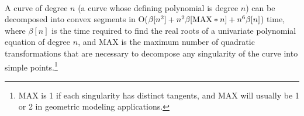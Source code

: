 \ \ \ 

\vspace{.1in}

\begin{theorem}
\label{thm-5}
A curve of degree $n$ {\rm (}a curve whose defining polynomial is degree $n${\rm )} 
can be decomposed into convex segments in
O{\rm (}$\beta[n^{2}] + n^{2}\beta[{\rm MAX} * n] + n^{6}\beta[n]${\rm )} time, 
where $\beta[n]$ is the time required to find the 
real roots of a univariate polynomial equation of degree $n$, and {\rm MAX} is the 
maximum number of quadratic transformations that are necessary to decompose any 
singularity of the curve into simple points.\footnote{MAX is 1 if each 
	singularity has distinct tangents, and MAX will usually be 1 or 2
	in geometric modeling applications. }
\end{theorem}

